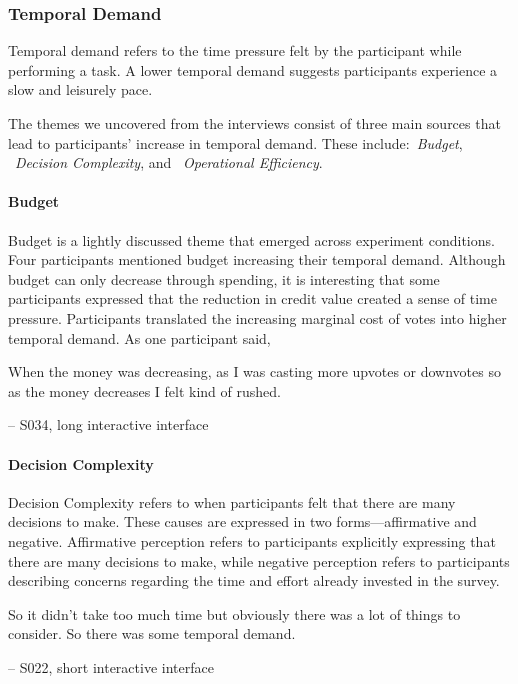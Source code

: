 \subsubsection{Temporal Demand}
Temporal demand refers to the time pressure felt by the participant while performing a task. A lower temporal demand suggests participants experience a slow and leisurely pace.

The themes we uncovered from the interviews consist of three main sources that lead to participants' increase in temporal demand. These include:~\textit{Budget}, ~\textit{Decision Complexity}, and ~\textit{Operational Efficiency}. 

\paragraph{Budget}
Budget is a lightly discussed theme that emerged across experiment conditions. Four participants mentioned budget increasing their temporal demand. Although budget can only decrease through spending, it is interesting that some participants expressed that the reduction in credit value created a sense of time pressure. Participants translated the increasing marginal cost of votes into higher temporal demand. As one participant said,

\begin{displayquote}
When the money was decreasing, as I was casting more upvotes or downvotes so as the money decreases I felt kind of rushed.
            
\noindent \hfill -- S034, long interactive interface
\end{displayquote}

\paragraph{Decision Complexity} Decision Complexity refers to when participants felt that there are many decisions to make. These causes are expressed in two forms—affirmative and negative. Affirmative perception refers to participants explicitly expressing that there are many decisions to make, while negative perception refers to participants describing concerns regarding the time and effort already invested in the survey.

\begin{displayquote}
So it didn't take too much time but obviously there was a lot of things to consider. So there was some temporal demand.
    
\noindent \hfill -- S022, short interactive interface
\end{displayquote}

